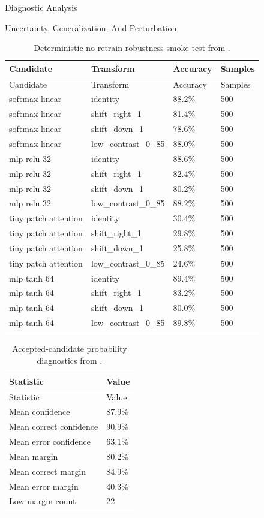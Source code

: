 \documentclass[
  ignorenonframetext,
]{beamer}
\begin{document}
\begin{frame}{Diagnostic Analysis}
\begin{block}{Uncertainty, Generalization, And Perturbation}
\begin{longtable}[]{@{}llll@{}}
\caption{Deterministic no-retrain robustness smoke test from
\protect{}.}\label{tbl:robustness-scores}\tabularnewline
\toprule\noalign{}
Candidate & Transform & Accuracy & Samples \\
\midrule\noalign{}
\endfirsthead
\toprule\noalign{}
Candidate & Transform & Accuracy & Samples \\
\midrule\noalign{}
\endhead
softmax linear & identity & 88.2\% & 500 \\
softmax linear & shift\_right\_1 & 81.4\% & 500 \\
softmax linear & shift\_down\_1 & 78.6\% & 500 \\
softmax linear & low\_contrast\_0\_85 & 88.0\% & 500 \\
mlp relu 32 & identity & 88.6\% & 500 \\
mlp relu 32 & shift\_right\_1 & 82.4\% & 500 \\
mlp relu 32 & shift\_down\_1 & 80.2\% & 500 \\
mlp relu 32 & low\_contrast\_0\_85 & 88.2\% & 500 \\
tiny patch attention & identity & 30.4\% & 500 \\
tiny patch attention & shift\_right\_1 & 29.8\% & 500 \\
tiny patch attention & shift\_down\_1 & 25.8\% & 500 \\
tiny patch attention & low\_contrast\_0\_85 & 24.6\% & 500 \\
mlp tanh 64 & identity & 89.4\% & 500 \\
mlp tanh 64 & shift\_right\_1 & 83.2\% & 500 \\
mlp tanh 64 & shift\_down\_1 & 80.0\% & 500 \\
mlp tanh 64 & low\_contrast\_0\_85 & 89.8\% & 500 \\
\bottomrule\noalign{}
\end{longtable}

\begin{longtable}[]{@{}ll@{}}
\caption{Accepted-candidate probability diagnostics from
\protect{}.}\label{tbl:probability-diagnostics}\tabularnewline
\toprule\noalign{}
Statistic & Value \\
\midrule\noalign{}
\endfirsthead
\toprule\noalign{}
Statistic & Value \\
\midrule\noalign{}
\endhead
Mean confidence & 87.9\% \\
Mean correct confidence & 90.9\% \\
Mean error confidence & 63.1\% \\
Mean margin & 80.2\% \\
Mean correct margin & 84.9\% \\
Mean error margin & 40.3\% \\
Low-margin count & 22 \\
\bottomrule\noalign{}
\end{longtable}


\end{block}
\end{frame}
\end{document}
